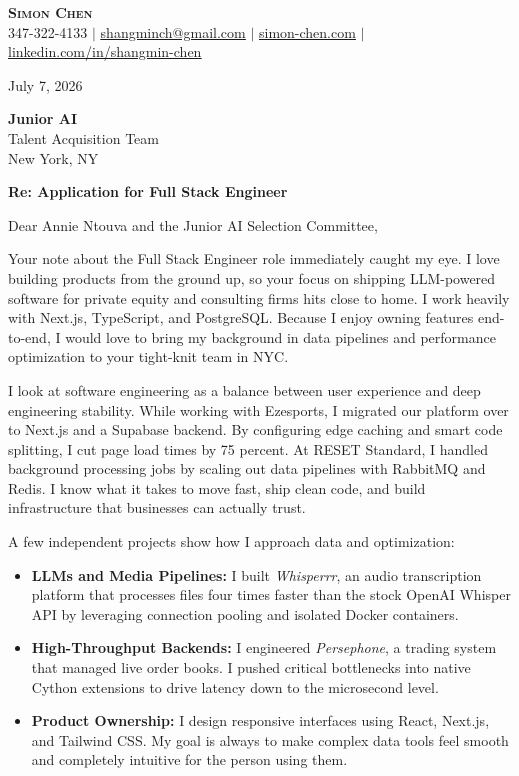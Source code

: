\documentclass[letterpaper,11pt]{article}
\begin{document}
\begin{center}
    \textbf{\Huge \scshape Simon Chen} \\ \vspace{1pt}
    \small 347-322-4133 $|$ \href{mailto:shangminch@gmail.com}{\underline{shangminch@gmail.com}} $|$ \href{https://simon-chen.com}{\underline{simon-chen.com}} $|$ \href{https://linkedin.com/in/shangmin-chen}{\underline{linkedin.com/in/shangmin-chen}}
\end{center}

\vspace{10pt}

July 7, 2026

\vspace{8pt}
\textbf{Junior AI} \\
Talent Acquisition Team \\
New York, NY

\vspace{8pt}
\textbf{Re: Application for Full Stack Engineer}

\vspace{8pt}
Dear Annie Ntouva and the Junior AI Selection Committee,

Your note about the Full Stack Engineer role immediately caught my eye. I love building products from the ground up, so your focus on shipping LLM-powered software for private equity and consulting firms hits close to home. I work heavily with Next.js, TypeScript, and PostgreSQL. Because I enjoy owning features end-to-end, I would love to bring my background in data pipelines and performance optimization to your tight-knit team in NYC.

I look at software engineering as a balance between user experience and deep engineering stability. While working with Ezesports, I migrated our platform over to Next.js and a Supabase backend. By configuring edge caching and smart code splitting, I cut page load times by 75 percent. At RESET Standard, I handled background processing jobs by scaling out data pipelines with RabbitMQ and Redis. I know what it takes to move fast, ship clean code, and build infrastructure that businesses can actually trust.

A few independent projects show how I approach data and optimization:
\begin{itemize}[leftmargin=*,noitemsep,topsep=4pt]
    \item \textbf{LLMs and Media Pipelines:} I built \textit{Whisperrr}, an audio transcription platform that processes files four times faster than the stock OpenAI Whisper API by leveraging connection pooling and isolated Docker containers.
    \item \textbf{High-Throughput Backends:} I engineered \textit{Persephone}, a trading system that managed live order books. I pushed critical bottlenecks into native Cython extensions to drive latency down to the microsecond level.
    \item \textbf{Product Ownership:} I design responsive interfaces using React, Next.js, and Tailwind CSS. My goal is always to make complex data tools feel smooth and completely intuitive for the person using them.
\end{itemize}
\end{document}
